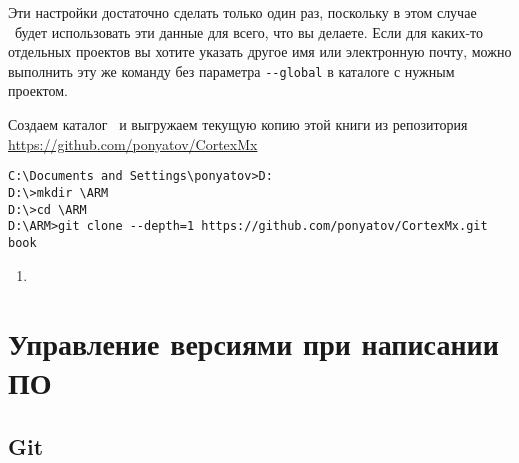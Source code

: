 \bigskip
Эти настройки достаточно сделать только один раз, поскольку в этом случае 
\git\ будет использовать эти данные для всего, что вы делаете.
 Если для каких-то отдельных проектов вы хотите указать другое имя или
электронную почту, можно выполнить эту же команду без параметра \verb|--global|
в каталоге с нужным проектом.

\bigskip
Создаем каталог \ и выгружаем текущую копию этой книги из репозитория
\url{https://github.com/ponyatov/CortexMx}

\bigskip{}

\bigskip
\begin{lstlisting}[style=con]
C:\Documents and Settings\ponyatov>D:
D:\>mkdir \ARM
D:\>cd \ARM
D:\ARM>git clone --depth=1 https://github.com/ponyatov/CortexMx.git book
\end{lstlisting}

\begin{enumerate}
\item 
\end{enumerate}


\chapter{Управление версиями при написании ПО}

\section{Git}\label{git}\cite{progit}
